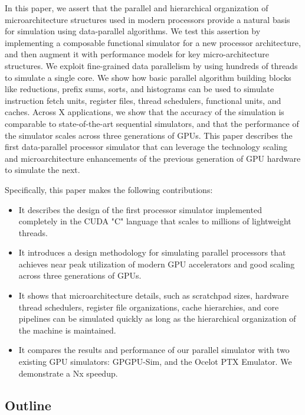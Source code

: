 \documentclass[conference, 10pt]{IEEEtran}
\begin{document}
In this paper, we assert that the parallel and hierarchical organization of
microarchitecture structures used in modern processors provide a natural
basis for simulation using data-parallel algorithms.  We test this assertion by
implementing a composable functional simulator for a new processor architecture,
and then augment it with performance models for key micro-architecture
structures.  We exploit fine-grained data parallelism by using hundreds of
threads to simulate a single core.  We show how basic parallel algorithm
building blocks like reductions, prefix sums, sorts, and histograms can be used
to simulate instruction fetch units, register files, thread schedulers,
functional units, and caches.  Across X applications, we show that the accuracy
of the simulation is comparable to state-of-the-art sequential simulators, and
that the performance of the simulator scales across three generations of GPUs.
This paper describes the first data-parallel processor simulator that can 
leverage the technology scaling and microarchitecture enhancements of the
previous generation of GPU hardware to simulate the next.

Specifically, this paper makes the following contributions:

\begin{itemize}
	\item It describes the design of the first processor simulator implemented
		completely in the CUDA "C" language that scales to millions of
		lightweight threads.

	\item It introduces a design methodology for simulating parallel processors
		that achieves near peak utilization of modern GPU accelerators and
		good scaling across three generations of GPUs.
		
	\item It shows that microarchitecture details, such as scratchpad sizes,
		hardware thread schedulers, register file organizations, cache
		hierarchies, and core pipelines can be simulated quickly as long as
		the hierarchical organization of the machine is maintained.
	
	\item It compares the results and performance of our parallel simulator with
		two existing GPU simulators: GPGPU-Sim, and the Ocelot PTX Emulator.  
		We demonstrate a Nx speedup.
\end{itemize}

\subsection{Outline}
\end{document}
